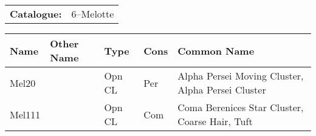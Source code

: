 \begin{tabular}{ p{0.9in} p{1.3in}}
{\bf Catalogue:} & 6--Melotte \\ 
\end{tabular}
\begin{longtable}{ p{0.7in}  p{1.0in}  p{0.6in}  p{0.9in}  p{5.1in} }
\hline 
{\bf Name} & {\bf Other Name} & {\bf Type} & {\bf Cons} & {\bf Common Name} \\ 
\hline 
Mel20 &  & Opn CL & Per & Alpha Persei Moving Cluster, Alpha Persei Cluster \\ 
Mel111 &  & Opn CL & Com & Coma Berenices Star Cluster, Coarse Hair, Tuft \\ 
\hline 
\end{longtable} 
